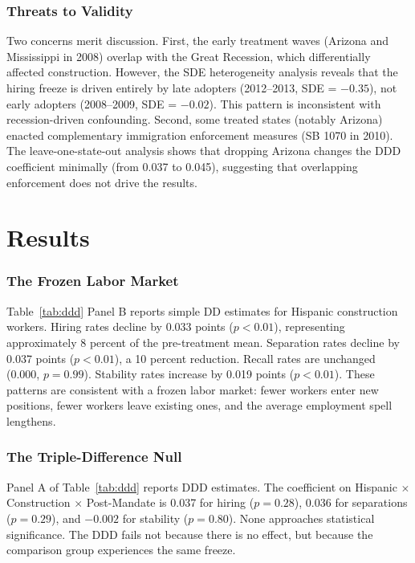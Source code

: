 \documentclass[12pt]{article}
\begin{document}
\subsubsection*{Threats to Validity} Two concerns merit discussion. First, the early treatment waves (Arizona and Mississippi in 2008) overlap with the Great Recession, which differentially affected construction. However, the SDE heterogeneity analysis reveals that the hiring freeze is driven entirely by late adopters (2012--2013, SDE = $-0.35$), not early adopters (2008--2009, SDE = $-0.02$). This pattern is inconsistent with recession-driven confounding. Second, some treated states (notably Arizona) enacted complementary immigration enforcement measures (SB 1070 in 2010). The leave-one-state-out analysis shows that dropping Arizona changes the DDD coefficient minimally (from 0.037 to 0.045), suggesting that overlapping enforcement does not drive the results.

\section{Results}
\label{sec:results}

\subsubsection*{The Frozen Labor Market} Table~\ref{tab:ddd} Panel B reports simple DD estimates for Hispanic construction workers. Hiring rates decline by 0.033 points ($p < 0.01$), representing approximately 8 percent of the pre-treatment mean. Separation rates decline by 0.037 points ($p < 0.01$), a 10 percent reduction. Recall rates are unchanged (0.000, $p = 0.99$). Stability rates increase by 0.019 points ($p < 0.01$). These patterns are consistent with a frozen labor market: fewer workers enter new positions, fewer workers leave existing ones, and the average employment spell lengthens.



\subsubsection*{The Triple-Difference Null} Panel A of Table~\ref{tab:ddd} reports DDD estimates. The coefficient on Hispanic $\times$ Construction $\times$ Post-Mandate is 0.037 for hiring ($p = 0.28$), 0.036 for separations ($p = 0.29$), and $-0.002$ for stability ($p = 0.80$). None approaches statistical significance. The DDD fails not because there is no effect, but because the comparison group experiences the same freeze.
\end{document}
